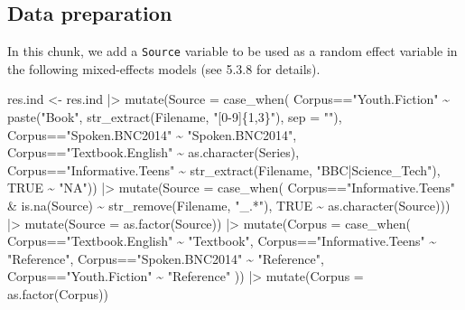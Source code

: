 \documentclass[
  letterpaper,
  DIV=11,
  numbers=noendperiod]{scrreprt}
\newenvironment{Shaded}{\begin{snugshade}}{\end{snugshade}}
\newcommand{\AttributeTok}[1]{\textcolor[rgb]{0.40,0.45,0.13}{#1}}
\newcommand{\ConstantTok}[1]{\textcolor[rgb]{0.56,0.35,0.01}{#1}}
\newcommand{\FunctionTok}[1]{\textcolor[rgb]{0.28,0.35,0.67}{#1}}
\newcommand{\NormalTok}[1]{\textcolor[rgb]{0.00,0.23,0.31}{#1}}
\newcommand{\OtherTok}[1]{\textcolor[rgb]{0.00,0.23,0.31}{#1}}
\newcommand{\SpecialCharTok}[1]{\textcolor[rgb]{0.37,0.37,0.37}{#1}}
\newcommand{\StringTok}[1]{\textcolor[rgb]{0.13,0.47,0.30}{#1}}
\begin{document}
\subsection{Data preparation}\label{data-preparation}

In this chunk, we add a \texttt{Source} variable to be used as a random
effect variable in the following mixed-effects models (see 5.3.8 for
details).

\begin{Shaded}
\begin{Highlighting}[]
\NormalTok{res.ind }\OtherTok{\textless{}{-}}\NormalTok{ res.ind }\SpecialCharTok{|\textgreater{}} 
  \FunctionTok{mutate}\NormalTok{(}\AttributeTok{Source =} \FunctionTok{case\_when}\NormalTok{(}
\NormalTok{  Corpus}\SpecialCharTok{==}\StringTok{"Youth.Fiction"} \SpecialCharTok{\textasciitilde{}} \FunctionTok{paste}\NormalTok{(}\StringTok{"Book"}\NormalTok{, }\FunctionTok{str\_extract}\NormalTok{(Filename, }\StringTok{"[0{-}9]\{1,3\}"}\NormalTok{), }\AttributeTok{sep =} \StringTok{""}\NormalTok{),}
\NormalTok{  Corpus}\SpecialCharTok{==}\StringTok{"Spoken.BNC2014"} \SpecialCharTok{\textasciitilde{}} \StringTok{"Spoken.BNC2014"}\NormalTok{,}
\NormalTok{  Corpus}\SpecialCharTok{==}\StringTok{"Textbook.English"} \SpecialCharTok{\textasciitilde{}} \FunctionTok{as.character}\NormalTok{(Series),}
\NormalTok{  Corpus}\SpecialCharTok{==}\StringTok{"Informative.Teens"} \SpecialCharTok{\textasciitilde{}} \FunctionTok{str\_extract}\NormalTok{(Filename, }\StringTok{"BBC|Science\_Tech"}\NormalTok{),}
  \ConstantTok{TRUE} \SpecialCharTok{\textasciitilde{}} \StringTok{"NA"}\NormalTok{)) }\SpecialCharTok{|\textgreater{}} 
  \FunctionTok{mutate}\NormalTok{(}\AttributeTok{Source =} \FunctionTok{case\_when}\NormalTok{(}
\NormalTok{  Corpus}\SpecialCharTok{==}\StringTok{"Informative.Teens"} \SpecialCharTok{\&} \FunctionTok{is.na}\NormalTok{(Source) }\SpecialCharTok{\textasciitilde{}} \FunctionTok{str\_remove}\NormalTok{(Filename, }\StringTok{"\_.*"}\NormalTok{),}
  \ConstantTok{TRUE} \SpecialCharTok{\textasciitilde{}} \FunctionTok{as.character}\NormalTok{(Source))) }\SpecialCharTok{|\textgreater{}} 
  \FunctionTok{mutate}\NormalTok{(}\AttributeTok{Source =} \FunctionTok{as.factor}\NormalTok{(Source)) }\SpecialCharTok{|\textgreater{}} 
  \FunctionTok{mutate}\NormalTok{(}\AttributeTok{Corpus =} \FunctionTok{case\_when}\NormalTok{(}
\NormalTok{    Corpus}\SpecialCharTok{==}\StringTok{"Textbook.English"} \SpecialCharTok{\textasciitilde{}} \StringTok{"Textbook"}\NormalTok{,}
\NormalTok{    Corpus}\SpecialCharTok{==}\StringTok{"Informative.Teens"} \SpecialCharTok{\textasciitilde{}} \StringTok{"Reference"}\NormalTok{,}
\NormalTok{    Corpus}\SpecialCharTok{==}\StringTok{"Spoken.BNC2014"} \SpecialCharTok{\textasciitilde{}} \StringTok{"Reference"}\NormalTok{,}
\NormalTok{    Corpus}\SpecialCharTok{==}\StringTok{"Youth.Fiction"} \SpecialCharTok{\textasciitilde{}} \StringTok{"Reference"}
\NormalTok{  )) }\SpecialCharTok{|\textgreater{}} 
  \FunctionTok{mutate}\NormalTok{(}\AttributeTok{Corpus =} \FunctionTok{as.factor}\NormalTok{(Corpus))}


\end{Highlighting}
\end{Shaded}
\end{document}
